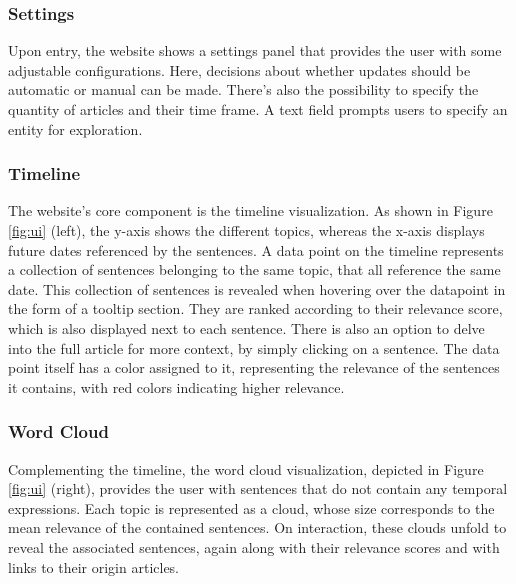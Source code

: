 \documentclass[sigconf]{acmart}
\begin{document}
\subsubsection{Settings}
Upon entry, the website shows a settings panel that provides the user with some adjustable configurations. Here, decisions about whether updates should be automatic or manual can be made. There's also the possibility to specify the quantity of articles and their time frame. A text field prompts users to specify an entity for exploration.


\subsubsection{Timeline}
The website's core component is the timeline visualization. As shown in Figure \ref{fig:ui} (left), the y-axis shows the different topics, whereas the x-axis displays future dates referenced by the sentences. A data point on the timeline represents a collection of sentences belonging to the same topic, that all reference the same date. This collection of sentences is revealed when hovering over the datapoint in the form of a tooltip section. They are ranked according to their relevance score, which is also displayed next to each sentence. There is also an option to delve into the full article for more context, by simply clicking on a sentence. The data point itself has a color assigned to it, representing the relevance of the sentences it contains, with red colors indicating higher relevance.

\subsubsection{Word Cloud}
Complementing the timeline, the word cloud visualization, depicted in Figure \ref{fig:ui} (right), provides the user with sentences that do not contain any temporal expressions. Each topic is represented as a cloud, whose size corresponds to the mean relevance of the contained sentences. On interaction, these clouds unfold to reveal the associated sentences, again along with their relevance scores and with links to their origin articles.
\end{document}
